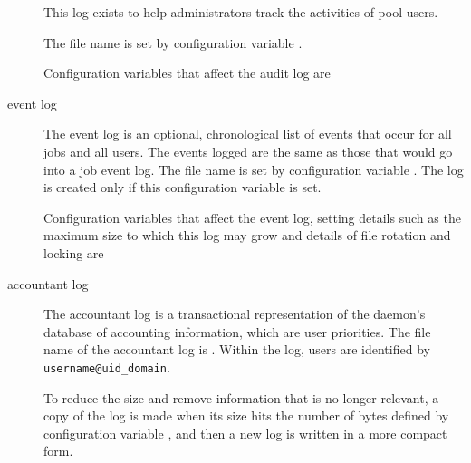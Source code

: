 \begin{description}
  This log exists to help administrators track the activities of pool users.

  The file name is set by configuration variable 
  .

  Configuration variables that affect the audit log are
  \begin{description}
  \item []
  \item []
  \end{description}

\item[event log]
  The event log is an optional, chronological list of events that occur
  for all jobs and all users.
  The events logged are the same as those that would go into a job event
  log.
  The file name is set by configuration variable .
  The log is created only if this configuration variable is set.

  Configuration variables that affect the event log, 
  setting details such as
  the maximum size to which this log may grow and details of file rotation
  and locking are
  \begin{description}
  \item [] 
  \item []
  \item []
  \item []
  \item []
  \item []
  \item []
  \end{description}

  
\item[accountant log]
  The accountant log is a transactional representation of the 
   daemon's database of accounting information,
  which are user priorities.
  The file name of the accountant log is .
  Within the log, users are identified by  \verb|username@uid_domain|. 

  To reduce the size and remove information that is no longer relevant,
  a copy of the log is made when its size hits the number of bytes
  defined by configuration variable ,
  and then a new log is written in a more compact form. 


\end{description}
